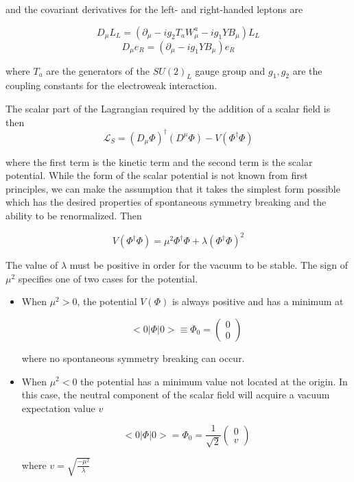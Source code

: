 	and the covariant derivatives for the left- and right-handed leptons are

	\begin{equation}
	D_{\mu}L_{L} = (\partial_{\mu}- ig_{2}T_{a}W_{\mu}^{a}-ig_{1}YB_{\mu})L_{L}
	\end{equation}
	\begin{equation}
	D_{\mu}e_{R} = (\partial_{\mu}- ig_{1}YB_{\mu})e_{R}
	\end{equation}

	where $T_{a}$ are the generators of the $SU(2)_{L}$ gauge group and $g_{1},g_{2}$ are the coupling constants for the electroweak interaction.

	The scalar part of the Lagrangian required by the addition of a scalar field is then
		\begin{equation}
			\mathcal{L}_{S} = (D_{\mu}\Phi)^{\dagger}(D^{\mu}\Phi) - V(\Phi^{\dagger}\Phi)
		\end{equation}

	where the first term is the kinetic term and the second term is the scalar potential. While the form of the scalar potential is not known from first principles, we can make the assumption that it takes the simplest form possible which has the desired properties of spontaneous symmetry breaking and the ability to be renormalized. Then

		\begin{equation}
		V(\Phi^{\dagger}\Phi) = \mu^{2}\Phi^{\dagger}\Phi+\lambda(\Phi^{\dagger}\Phi)^{2}
		\end{equation}

	The value of $\lambda$ must be positive in order for the vacuum to be stable. The sign of $\mu^{2}$ specifies one of two cases for the potential.

	\begin{itemize}
			\item When $\mu^{2}>0$, the potential $V(\Phi)$ is always positive and has a minimum at

			\begin{equation}
			<0|\Phi|0>\equiv\Phi_{0} = \begin{pmatrix} 0 \\ 0 \end{pmatrix}
			\end{equation}

			where no spontaneous symmetry breaking can occur. 

			\item When $\mu^{2}<0$ the potential has a minimum value not located at the origin. In this case, the neutral component of the scalar field will acquire a vacuum expectation value $v$

			\begin{equation}
			<0|\Phi|0> = \Phi_{0} = \frac{1}{\sqrt{2}}\begin{pmatrix} 0 \\ v \end{pmatrix}
			\end{equation}

			where $v=\sqrt{\frac{-\mu^{2}}{\lambda}}$
	\end{itemize}

